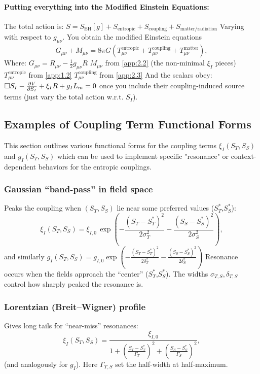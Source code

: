 \documentclass[11pt,a4paper]{article} %
\newcommand{\ST}{S_T}
\newcommand{\SSp}{S_S} %
\newcommand{\Scoupling}{S_{\text{coupling}}}
\newcommand{\SEH}{S_{\text{EH}}}
\newcommand{\Smatterradiation}{S_{\text{matter/radiation}}}
\newcommand{\Sentropic}{S_{\text{entropic}}}
\newcommand{\Lm}{L_m}
\newcommand{\Mmu}{M} %
\newcommand{\Tmnentropic}{T^{\text{entropic}}_{\mu\nu}}
\newcommand{\Tmncoupling}{T^{\text{coupling}}_{\mu\nu}}
\newcommand{\Tmnmatter}{T^{\text{matter}}_{\mu\nu}}
\begin{document}
\paragraph{Putting everything into the Modified Einstein Equations:}
The total action is:
$S=\SEH[g]+\Sentropic+\Scoupling+\Smatterradiation$
Varying with respect to $g_{\mu\nu}$. You obtain the modified Einstein equations
\begin{equation}
\label{eq:modified_Einstein_from_appendix_full}
G_{\mu\nu}+\Mmu_{\mu\nu}=8\pi G(\Tmnentropic+\Tmncoupling+\Tmnmatter),
\end{equation}
Where:
$G_{\mu\nu}=R_{\mu\nu}-\frac{1}{2}g_{\mu\nu}R$
$\Mmu_{\mu\nu}$ from \cref{app:2.2} (the non-minimal $\xi_I$ pieces)
$\Tmnentropic$ from \cref{app:1.2}
$\Tmncoupling$ from \cref{app:2.3}
And the scalars obey:
$\Box S_I-\pdv{V}{S_I}+\xi_I R+g_I\Lm=0$
once you include their coupling-induced source terms (just vary the total action w.r.t. $S_I$).

\subsection{Examples of Coupling Term Functional Forms}
\label{app:A.4}
This section outlines various functional forms for the coupling terms $\xi_I(\ST,\SSp)$ and $g_I(\ST,\SSp)$ which can be used to implement specific "resonance" or context-dependent behaviors for the entropic couplings.

\subsubsection{Gaussian “band-pass” in field space}
Peaks the coupling when $(\ST,\SSp)$ lie near some preferred values ($\ST^*$,$\SSp^*$):
\begin{equation*}
\xi_{I}(\ST,\SSp) =\xi_{I,0}\, \exp\!{\left(-\frac{(\ST-\ST^*)^2}{2\sigma_T^2}-\frac{(\SSp-\SSp^*)^2}{2\sigma_S^2}\right)},
\end{equation*}
and similarly
$g_{I}(\ST,\SSp)=g_{I,0}\exp\left(-\frac{(\ST-\ST^*)^2}{2\delta_T^2}-\frac{(\SSp-\SSp^*)^2}{2\delta_S^2}\right)$
Resonance occurs when the fields approach the ``center'' ($\ST^*$,$\SSp^*$).
The widths $\sigma_{T,S},\delta_{T,S}$ control how sharply peaked the resonance is.

\subsubsection{Lorentzian (Breit–Wigner) profile}
Gives long tails for ``near-miss'' resonances:
\begin{equation*}
\xi_I(\ST,\SSp)=\frac{\xi_{I,0}}{1+\left(\frac{\ST-\ST^*}{\Gamma_T}\right)^2+\left(\frac{\SSp-\SSp^*}{\Gamma_S}\right)^2},
\end{equation*}
(and analogously for $g_I$). Here $\Gamma_{T,S}$ set the half-width at half-maximum.
\end{document}
